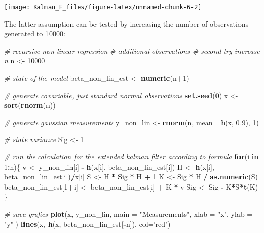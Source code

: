 \documentclass[
]{article}
\newenvironment{Shaded}{\begin{snugshade}}{\end{snugshade}}
\newcommand{\CommentTok}[1]{\textcolor[rgb]{0.56,0.35,0.01}{\textit{#1}}}
\newcommand{\ControlFlowTok}[1]{\textcolor[rgb]{0.13,0.29,0.53}{\textbf{#1}}}
\newcommand{\DataTypeTok}[1]{\textcolor[rgb]{0.13,0.29,0.53}{#1}}
\newcommand{\DecValTok}[1]{\textcolor[rgb]{0.00,0.00,0.81}{#1}}
\newcommand{\FloatTok}[1]{\textcolor[rgb]{0.00,0.00,0.81}{#1}}
\newcommand{\KeywordTok}[1]{\textcolor[rgb]{0.13,0.29,0.53}{\textbf{#1}}}
\newcommand{\NormalTok}[1]{#1}
\newcommand{\OperatorTok}[1]{\textcolor[rgb]{0.81,0.36,0.00}{\textbf{#1}}}
\newcommand{\StringTok}[1]{\textcolor[rgb]{0.31,0.60,0.02}{#1}}
\begin{document}
\begin{center}\texttt{[image: Kalman\_F\_files/figure-latex/unnamed-chunk-6-2]} \end{center}

The latter assumption can be tested by increasing the number of
observations generated to 10000:

\begin{Shaded}
\begin{Highlighting}[]
\CommentTok{# recursive non linear regression}
\CommentTok{# additional observations}
\CommentTok{# second try increase n}
\NormalTok{n <-}\StringTok{ }\DecValTok{10000}

\CommentTok{# state of the model}
\NormalTok{beta_non_lin_est  <-}\StringTok{ }\KeywordTok{numeric}\NormalTok{(n}\OperatorTok{+}\DecValTok{1}\NormalTok{)}

\CommentTok{# generate covariable, just standard normal observations }
\KeywordTok{set.seed}\NormalTok{(}\DecValTok{0}\NormalTok{)}
\NormalTok{x  <-}\StringTok{ }\KeywordTok{sort}\NormalTok{(}\KeywordTok{rnorm}\NormalTok{(n))}

\CommentTok{# generate gaussian measurements}
\NormalTok{y_non_lin <-}\StringTok{ }\KeywordTok{rnorm}\NormalTok{(n, }\DataTypeTok{mean=} \KeywordTok{h}\NormalTok{(x, }\FloatTok{0.9}\NormalTok{), }\DecValTok{1}\NormalTok{)}

\CommentTok{# state variance }
\NormalTok{Sig <-}\StringTok{ }\DecValTok{1}

\CommentTok{# run the calculation for the extended kalman filter according to formula}
\ControlFlowTok{for}\NormalTok{(i }\ControlFlowTok{in} \DecValTok{1}\OperatorTok{:}\NormalTok{n)\{}
\NormalTok{    v  <-}\StringTok{ }\NormalTok{y_non_lin[i] }\OperatorTok{-}\StringTok{ }\KeywordTok{h}\NormalTok{(x[i], beta_non_lin_est[i])}
\NormalTok{    H <-}\StringTok{ }\KeywordTok{h}\NormalTok{(x[i], beta_non_lin_est[i])}\OperatorTok{/}\NormalTok{x[i]}
\NormalTok{    S  <-}\StringTok{ }\NormalTok{H }\OperatorTok{*}\StringTok{ }\NormalTok{Sig }\OperatorTok{*}\StringTok{ }\NormalTok{H }\OperatorTok{+}\StringTok{ }\DecValTok{1}
\NormalTok{    K  <-}\StringTok{ }\NormalTok{Sig }\OperatorTok{*}\StringTok{ }\NormalTok{H }\OperatorTok{/}\StringTok{ }\KeywordTok{as.numeric}\NormalTok{(S)}
\NormalTok{    beta_non_lin_est[}\DecValTok{1}\OperatorTok{+}\NormalTok{i]  <-}\StringTok{ }\NormalTok{beta_non_lin_est[i] }\OperatorTok{+}\StringTok{ }\NormalTok{K }\OperatorTok{*}\StringTok{ }\NormalTok{v}
\NormalTok{    Sig <-}\StringTok{ }\NormalTok{Sig }\OperatorTok{-}\StringTok{ }\NormalTok{K}\OperatorTok{*}\NormalTok{S}\OperatorTok{*}\KeywordTok{t}\NormalTok{(K)}
\NormalTok{\}}

\CommentTok{# save grafics}
\KeywordTok{plot}\NormalTok{(x, y_non_lin, }
    \DataTypeTok{main =} \StringTok{"Measurements"}\NormalTok{,}
    \DataTypeTok{xlab =} \StringTok{"x"}\NormalTok{,}
    \DataTypeTok{ylab =} \StringTok{"y"}
\NormalTok{)}
\KeywordTok{lines}\NormalTok{(x, }\KeywordTok{h}\NormalTok{(x, beta_non_lin_est[}\OperatorTok{-}\NormalTok{n]), }\DataTypeTok{col=}\StringTok{'red'}\NormalTok{)}
\end{Highlighting}
\end{Shaded}
\end{document}
